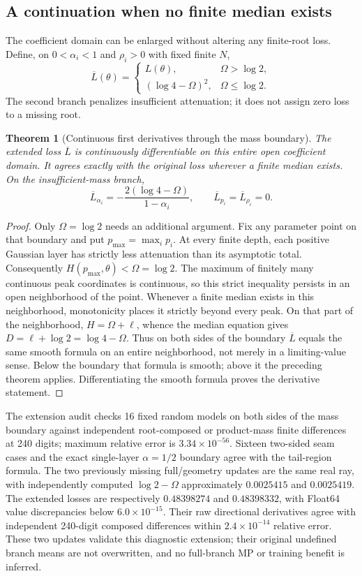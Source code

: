 \documentclass[11pt,a4paper]{article}
\newtheorem{theorem}{Theorem}
\begin{document}
\subsection{A continuation when no finite median exists}
The coefficient domain can be enlarged without altering any finite-root
loss. Define, on $0<\alpha_i<1$ and $\rho_i>0$ with fixed finite $N$,
\[
 \overline L(\theta)=
 \begin{cases}
  L(\theta),&\Omega>\log2,\\
  (\log4-\Omega)^2,&\Omega\leq\log2.
 \end{cases}
\]
The second branch penalizes insufficient attenuation; it does not assign
zero loss to a missing root.
\begin{theorem}[Continuous first derivatives through the mass boundary]
The extended loss $\overline L$ is continuously differentiable on this
entire open coefficient domain. It agrees exactly with the original
loss wherever a finite median exists. On the insufficient-mass branch,
\[
 \overline L_{\alpha_i}=-\frac{2(\log4-\Omega)}{1-\alpha_i},
 \qquad \overline L_{p_i}=\overline L_{\rho_i}=0.
\]
\end{theorem}
\begin{proof}
Only $\Omega=\log2$ needs an additional argument. Fix any parameter
point on that boundary and put $p_{\max}=\max_i p_i$. At every finite
depth, each positive Gaussian layer has strictly less attenuation than
its asymptotic total. Consequently
$H(p_{\max},\theta)<\Omega=\log2$.
The maximum of finitely many continuous peak coordinates is continuous,
so this strict inequality persists in an open neighborhood of the point.
Whenever a finite median exists in this neighborhood, monotonicity places
it strictly beyond every peak. On that part of the neighborhood,
$H=\Omega+\ell$, whence the median equation gives
$D=\ell+\log2=\log4-\Omega$. Thus on both sides of the boundary
$\overline L$ equals the same smooth formula on an entire neighborhood,
not merely in a limiting-value sense. Below the boundary that formula is
smooth; above it the preceding theorem applies. Differentiating the
smooth formula proves the derivative statement.
\end{proof}

The extension audit checks 16 fixed random models on both sides of the
mass boundary against independent root-composed or product-mass finite
differences at 240 digits; maximum relative error is
$3.34\times10^{-56}$. Sixteen two-sided seam cases and the exact
single-layer $\alpha=1/2$ boundary agree with the tail-region formula.
The two previously missing full/geometry updates are the same real ray,
with independently computed $\log2-\Omega$ approximately $0.0025415$
and $0.0025419$. The extended losses are respectively $0.48398274$
and $0.48398332$, with Float64 value discrepancies below
$6.0\times10^{-15}$. Their raw directional derivatives agree with
independent 240-digit composed differences within $2.4\times10^{-14}$
relative error. These two updates validate this diagnostic extension;
their original undefined branch means are not overwritten, and no
full-branch MP or training benefit is inferred.
\end{document}
